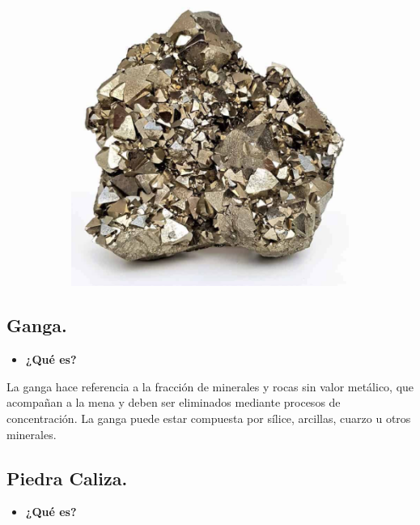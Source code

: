 \documentclass[12pt,a4paper]{article}
\begin{document}
\begin{figure}[h!]
\begin{subfigure}{0.45\textwidth}
        \includegraphics[width=\textwidth]{Inagenes para latex/pirita.png}
        \label{pirita}
    \end{subfigure}
\end{figure}

\subsection{Ganga.}

\begin{itemize}
    \item \textbf{¿Qué es?}
\end{itemize}

La ganga hace referencia a la fracción de minerales y rocas sin valor metálico, que acompañan a la mena y deben ser eliminados mediante procesos de concentración. La ganga puede estar compuesta por sílice, arcillas, cuarzo u otros minerales.

\subsection{Piedra Caliza.}

\begin{itemize}
    \item \textbf{¿Qué es?}
\end{itemize}
\end{document}
